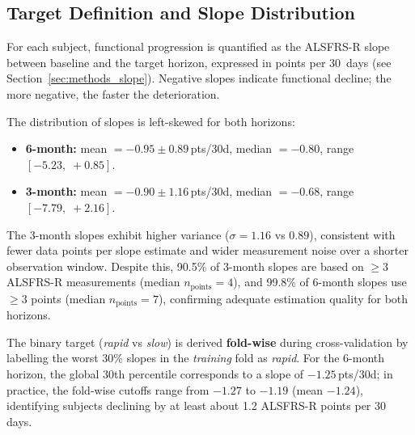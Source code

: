 \subsection{Target Definition and Slope Distribution}
\label{subsec:results_target_summary}
For each subject, functional progression is quantified as the ALSFRS-R slope between baseline and the target horizon, expressed in points per 30~days (see Section~\ref{sec:methods_slope}).
Negative slopes indicate functional decline; the more negative, the faster the deterioration.

The distribution of slopes is left-skewed for both horizons:
\begin{itemize}
  \item \textbf{6-month:} mean $= -0.95 \pm 0.89$\,pts/30d, median $= -0.80$, range $[-5.23,\; +0.85]$.
  \item \textbf{3-month:} mean $= -0.90 \pm 1.16$\,pts/30d, median $= -0.68$, range $[-7.79,\; +2.16]$.
\end{itemize}
The 3-month slopes exhibit higher variance ($\sigma = 1.16$ vs $0.89$), consistent with fewer data points per slope estimate and wider measurement noise over a shorter observation window.
Despite this, 90.5\% of 3-month slopes are based on $\geq 3$ ALSFRS-R measurements (median $n_{\text{points}} = 4$), and 99.8\% of 6-month slopes use $\geq 3$ points (median $n_{\text{points}} = 7$), confirming adequate estimation quality for both horizons.

The binary target (\textit{rapid} vs \textit{slow}) is derived \textbf{fold-wise} during cross-validation by labelling the worst 30\% slopes in the \emph{training} fold as \textit{rapid}.
For the 6-month horizon, the global 30th percentile corresponds to a slope of $-1.25$\,pts/30d; in practice, the fold-wise cutoffs range from $-1.27$ to $-1.19$ (mean $-1.24$), identifying subjects declining by at least about 1.2 ALSFRS-R points per 30 days.

